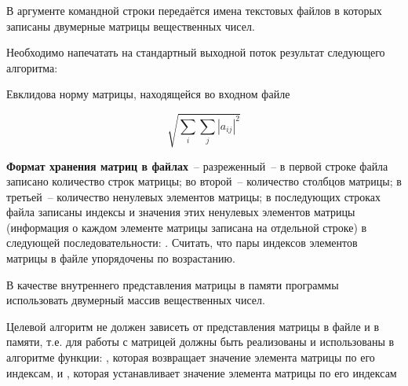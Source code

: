 
В аргументе командной строки передаётся имена текстовых файлов
в которых записаны двумерные матрицы
вещественных чисел.

Необходимо напечатать на стандартный выходной
поток результат следующего алгоритма:

Евклидова норму матрицы, находящейся во входном файле

$$
\sqrt{ \sum_i\sum_j{|a_{ij}|^2} }
$$

\textbf{Формат хранения матриц в файлах}~--
разреженный~-- в первой строке файла записано количество строк
матрицы; во второй~-- количество столбцов матрицы; в третьей~--
количество ненулевых элементов матрицы; в последующих строках
файла записаны индексы и значения этих ненулевых элементов
матрицы (информация о каждом элементе матрицы записана на
отдельной строке) в следующей последовательности: 
 . Считать, что пары индексов
элементов матрицы в файле упорядочены по возрастанию.

В качестве внутреннего представления матрицы в памяти программы
использовать двумерный массив вещественных чисел.

Целевой алгоритм не
должен зависеть от представления матрицы в файле и в памяти, т.е. для
работы с матрицей должны быть реализованы и использованы в алгоритме
функции: , которая возвращает
значение элемента матрицы по его индексам, и , которая устанавливает значение элемента
матрицы по его индексам
